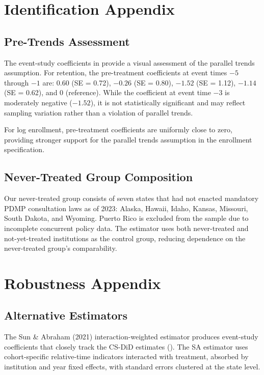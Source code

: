 \documentclass[12pt]{article}
\begin{document}
\section{Identification Appendix}

\subsection{Pre-Trends Assessment}

The event-study coefficients in  provide a visual assessment of the parallel trends assumption. For retention, the pre-treatment coefficients at event times $-5$ through $-1$ are: 0.60 (SE = 0.72), $-0.26$ (SE = 0.80), $-1.52$ (SE = 1.12), $-1.14$ (SE = 0.62), and 0 (reference). While the coefficient at event time $-3$ is moderately negative ($-1.52$), it is not statistically significant and may reflect sampling variation rather than a violation of parallel trends.

For log enrollment, pre-treatment coefficients are uniformly close to zero, providing stronger support for the parallel trends assumption in the enrollment specification.

\subsection{Never-Treated Group Composition}

Our never-treated group consists of seven states that had not enacted mandatory PDMP consultation laws as of 2023: Alaska, Hawaii, Idaho, Kansas, Missouri, South Dakota, and Wyoming. Puerto Rico is excluded from the sample due to incomplete concurrent policy data. The \citet{callaway2021difference} estimator uses both never-treated and not-yet-treated institutions as the control group, reducing dependence on the never-treated group's comparability.


\section{Robustness Appendix}

\subsection{Alternative Estimators}

The Sun \& Abraham (2021) interaction-weighted estimator produces event-study coefficients that closely track the CS-DiD estimates (). The SA estimator uses cohort-specific relative-time indicators interacted with treatment, absorbed by institution and year fixed effects, with standard errors clustered at the state level.
\end{document}
